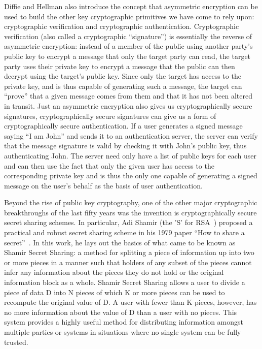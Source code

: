 \documentclass{sig-alternate}
\begin{document}
Diffie and Hellman also introduce the concept that asymmetric
encryption can be used to build the other key cryptographic primitives
we have come to rely upon: cryptographic verification and
cryptographic authentication. Cryptographic verification (also called
a cryptographic ``signature'') is essentially the reverse of
asymmetric encryption: instead of a member of the public using another
party's public key to encrypt a message that only the target party can
read, the target party uses their private key to encrypt a message
that the public can then decrypt using the target's public key. Since
only the target has access to the private key, and is thus capable of
generating such a message, the target can ``prove'' that a given
message comes from them and that it has not been altered in
transit. Just an asymmetric encryption also gives us cryptographically
secure signatures, cryptographically secure signatures can give us a
form of cryptographically secure authentication. If a user generates a
signed message saying ``I am John'' and sends it to an authentication
server, the server can verify that the message signature is valid by
checking it with John's public key, thus authenticating John. The
server need only have a list of public keys for each user and can then
use the fact that only the given user has access to the corresponding
private key and is thus the only one capable of generating a signed
message on the user's behalf as the basis of user authentication.

Beyond the rise of public key cryptography, one of the other major
cryptographic breakthroughs of the last fifty years was the invention
is cryptographically secure secret sharing schemes. In particular, Adi
Shamir (the 'S' for RSA~\cite{Rivest1978}) proposed a practical and
robust secret sharing scheme in his 1979 paper ``How to share a
secret''~\cite{Shamir1979}. In this work, he lays out the basics of
what came to be known as Shamir Secret Sharing: a method for splitting
a piece of information up into two or more pieces in a manner such
that holders of any subset of the pieces cannot infer any information
about the pieces they do not hold or the original information block as
a whole. Shamir Secret Sharing allows a user to divide a piece of data
D into N pieces of which K or more pieces can be used to recompute the
original value of D. A user with fewer than K pieces, however, has no
more information about the value of D than a user with no pieces. This
system provides a highly useful method for distributing information
amongst multiple parties or systems in situations where no single
system can be fully trusted.
\end{document}
